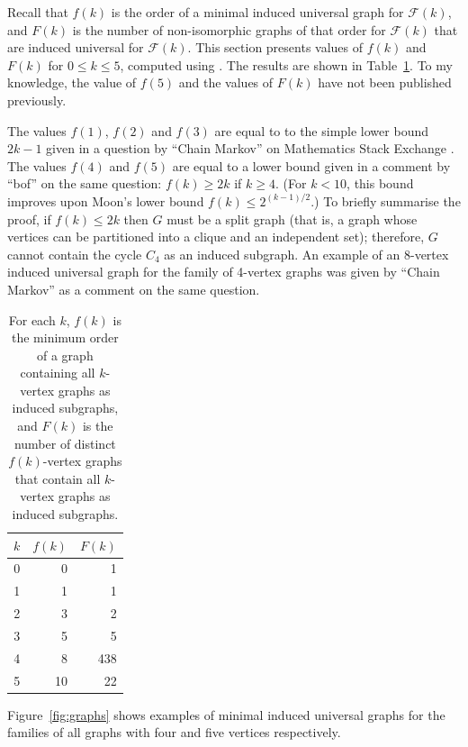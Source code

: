 \documentclass[12pt]{article}
\newcommand{\calF}{\ensuremath{\mathcal{F}}}
\begin{document}
Recall that $f(k)$ is the order of a minimal induced universal graph for
$\calF(k)$, and $F(k)$ is the number of non-isomorphic graphs of that order
for $\calF(k)$ that are induced universal for $\calF(k)$.  This section
presents values of $f(k)$ and $F(k)$ for $0 \leq k \leq 5$, computed
using . The results are shown in 
Table~\ref{tab:graphresults}.  To my knowledge, the value of
$f(5)$ and the values of $F(k)$ have not been published previously.

The values $f(1)$, $f(2)$ and $f(3)$ are equal to to the simple lower bound $2k
- 1$ given in a question by ``Chain Markov'' on Mathematics Stack Exchange
  \cite{math_se_question}.  The values $f(4)$ and $f(5)$ are equal to a lower
  bound given in a comment by ``bof'' on the same question: $f(k) \geq 2k$ if $k
  \geq 4$.  (For $k < 10$, this bound improves upon Moon's lower bound $f(k)
  \leq 2^{(k-1)/2}$.) To briefly summarise the proof, if $f(k) \leq 2k$ then $G$
  must be a split graph (that is, a graph whose vertices can be partitioned
  into a clique and an independent set); therefore, $G$ cannot contain the
  cycle $C_4$ as an induced subgraph.  An example of an 8-vertex induced
  universal graph for the family of 4-vertex graphs was given by ``Chain
  Markov'' as a comment on the same question.

\begin{table}[h!]
\centering
\begin{tabular}{r r r}
 \toprule
 $k$ & $f(k)$ & $F(k)$ \\ [0.5ex]
 \midrule
 0 & 0 & 1 \\
 1 & 1 & 1 \\
 2 & 3 & 2 \\
 3 & 5 & 5 \\
 4 & 8 & 438 \\
 5 & 10 & 22 \\
 \bottomrule
\end{tabular}
\caption{For each $k$, $f(k)$ is the minimum order of a graph containing all $k$-vertex graphs as
induced subgraphs, and $F(k)$ is the number of distinct $f(k)$-vertex graphs that contain
all $k$-vertex graphs as induced subgraphs.}
\label{tab:graphresults}
\end{table}
%
%

Figure~\ref{fig:graphs} shows examples of minimal induced universal graphs
for the families of all graphs with four and five vertices
respectively.
\end{document}
